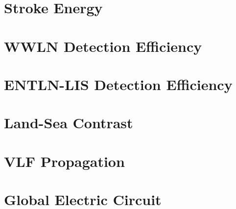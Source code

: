 \documentclass [11pt, twoside] {uwthesis}[2012/06/19]
\begin{document}
 
\chapter{Stroke Energy}
\label{thesis:chapter:energy}




\chapter{WWLN Detection Efficiency}
\label{thesis:chapter:efficiency}




\chapter{ENTLN-LIS Detection Efficiency}
\label{thesis:chapter:entln-lis}




\chapter{Land-Sea Contrast}
\label{thesis:chapter:landsea}




\chapter{VLF Propagation}
\label{thesis:chapter:prop}




 
\chapter{Global Electric Circuit}
\label{thesis:chapter:gec}



%
%



\end{document}
